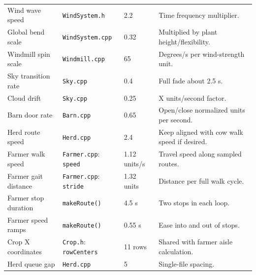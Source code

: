 \documentclass[11pt,a4paper,openany]{book}
\newcommand{\code}[1]{\texttt{#1}}
\newcommand{\file}[1]{\nolinkurl{#1}}
\begin{document}
\begin{longtable}{@{}p{}p{}p{}p{}@{}}
	Wind wave speed            & \file{WindSystem.h}                     & 2.2               & Time frequency multiplier.                                                               \\
	Global bend scale          & \file{WindSystem.cpp}                   & 0.32              & Multiplied by plant height/flexibility.                                                  \\
	Windmill spin scale        & \file{Windmill.cpp}                     & 65                & Degrees/s per wind-strength unit.                                                        \\
	Sky transition rate        & \file{Sky.cpp}                          & 0.4               & Full fade about 2.5 s.                                                                   \\
	Cloud drift                & \file{Sky.cpp}                          & 0.25              & X units/second factor.                                                                   \\
	Barn door rate             & \file{Barn.cpp}                         & 0.65              & Open/close normalized units per second.                                                  \\
	Herd route speed           & \file{Herd.cpp}                         & 2.4               & Keep aligned with cow walk speed if desired.                                             \\
	Farmer walk speed          & \file{Farmer.cpp}: \code{speed}         & 1.12 units/s      & Travel speed along sampled routes. \\
	Farmer gait distance       & \file{Farmer.cpp}: \code{stride}        & 1.32 units        & Distance per full walk cycle. \\
	Farmer stop duration       & \code{makeRoute()}                      & 4.5 s             & Two stops in each loop. \\
	Farmer speed ramps         & \code{makeRoute()}                      & 0.55 s            & Ease into and out of stops. \\
	Crop X coordinates         & \file{Crop.h}: \code{rowCenters}        & 11 rows           & Shared with farmer aisle calculation. \\
	Herd queue gap             & \file{Herd.cpp}                         & 5                 & Single-file spacing.                                                                     \\

\end{longtable}
\end{document}
